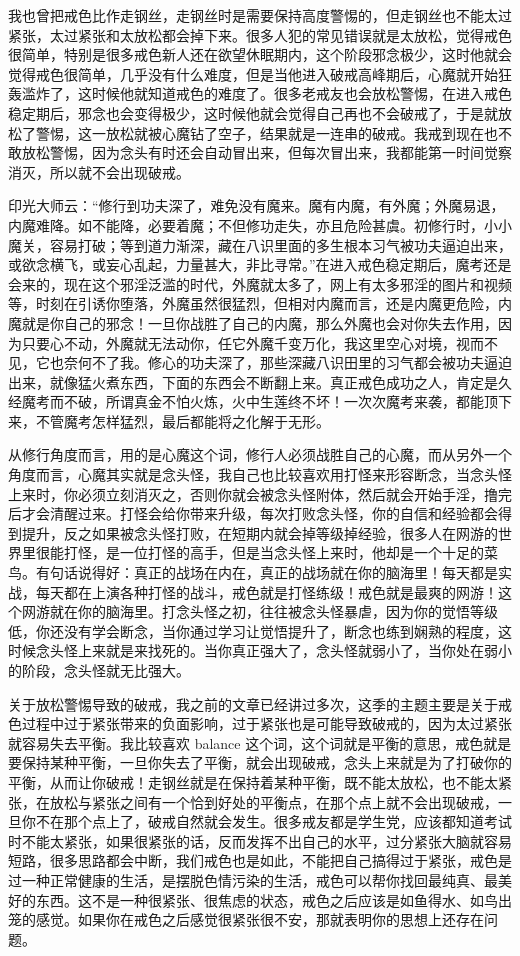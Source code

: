 我也曾把戒色比作走钢丝，走钢丝时是需要保持高度警惕的，但走钢丝也不能太过紧张，太过紧张和太放松都会掉下来。很多人犯的常见错误就是太放松，觉得戒色很简单，特别是很多戒色新人还在欲望休眠期内，这个阶段邪念极少，这时他就会觉得戒色很简单，几乎没有什么难度，但是当他进入破戒高峰期后，心魔就开始狂轰滥炸了，这时候他就知道戒色的难度了。很多老戒友也会放松警惕，在进入戒色稳定期后，邪念也会变得极少，这时候他就会觉得自己再也不会破戒了，于是就放松了警惕，这一放松就被心魔钻了空子，结果就是一连串的破戒。我戒到现在也不敢放松警惕，因为念头有时还会自动冒出来，但每次冒出来，我都能第一时间觉察消灭，所以就不会出现破戒。

印光大师云：“修行到功夫深了，难免没有魔来。魔有内魔，有外魔；外魔易退，内魔难降。如不能降，必要着魔；不但修功走失，亦且危险甚虞。初修行时，小小魔关，容易打破；等到道力渐深，藏在八识里面的多生根本习气被功夫逼迫出来，或欲念横飞，或妄心乱起，力量甚大，非比寻常。”在进入戒色稳定期后，魔考还是会来的，现在这个邪淫泛滥的时代，外魔就太多了，网上有太多邪淫的图片和视频等，时刻在引诱你堕落，外魔虽然很猛烈，但相对内魔而言，还是内魔更危险，内魔就是你自己的邪念！一旦你战胜了自己的内魔，那么外魔也会对你失去作用，因为只要心不动，外魔就无法动你，任它外魔千变万化，我这里空心对境，视而不见，它也奈何不了我。修心的功夫深了，那些深藏八识田里的习气都会被功夫逼迫出来，就像猛火煮东西，下面的东西会不断翻上来。真正戒色成功之人，肯定是久经魔考而不破，所谓真金不怕火炼，火中生莲终不坏！一次次魔考来袭，都能顶下来，不管魔考怎样猛烈，最后都能将之化解于无形。

从修行角度而言，用的是心魔这个词，修行人必须战胜自己的心魔，而从另外一个角度而言，心魔其实就是念头怪，我自己也比较喜欢用打怪来形容断念，当念头怪上来时，你必须立刻消灭之，否则你就会被念头怪附体，然后就会开始手淫，撸完后才会清醒过来。打怪会给你带来升级，每次打败念头怪，你的自信和经验都会得到提升，反之如果被念头怪打败，在短期内就会掉等级掉经验，很多人在网游的世界里很能打怪，是一位打怪的高手，但是当念头怪上来时，他却是一个十足的菜鸟。有句话说得好：真正的战场在内在，真正的战场就在你的脑海里！每天都是实战，每天都在上演各种打怪的战斗，戒色就是打怪练级！戒色就是最爽的网游！这个网游就在你的脑海里。打念头怪之初，往往被念头怪暴虐，因为你的觉悟等级低，你还没有学会断念，当你通过学习让觉悟提升了，断念也练到娴熟的程度，这时候念头怪上来就是来找死的。当你真正强大了，念头怪就弱小了，当你处在弱小的阶段，念头怪就无比强大。

关于放松警惕导致的破戒，我之前的文章已经讲过多次，这季的主题主要是关于戒色过程中过于紧张带来的负面影响，过于紧张也是可能导致破戒的，因为太过紧张就容易失去平衡。我比较喜欢 balance 这个词，这个词就是平衡的意思，戒色就是要保持某种平衡，一旦你失去了平衡，就会出现破戒，念头上来就是为了打破你的平衡，从而让你破戒！走钢丝就是在保持着某种平衡，既不能太放松，也不能太紧张，在放松与紧张之间有一个恰到好处的平衡点，在那个点上就不会出现破戒，一旦你不在那个点上了，破戒自然就会发生。很多戒友都是学生党，应该都知道考试时不能太紧张，如果很紧张的话，反而发挥不出自己的水平，过分紧张大脑就容易短路，很多思路都会中断，我们戒色也是如此，不能把自己搞得过于紧张，戒色是过一种正常健康的生活，是摆脱色情污染的生活，戒色可以帮你找回最纯真、最美好的东西。这不是一种很紧张、很焦虑的状态，戒色之后应该是如鱼得水、如鸟出笼的感觉。如果你在戒色之后感觉很紧张很不安，那就表明你的思想上还存在问题。

